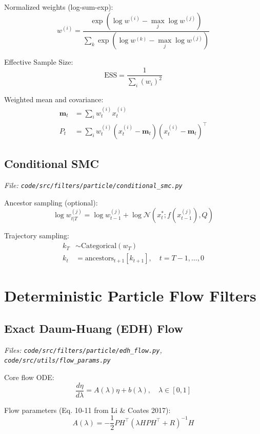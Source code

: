 \documentclass[12pt]{article}
\begin{document}
Normalized weights (log-sum-exp):
\begin{equation}
w^{(i)} = \frac{\exp(\log w^{(i)} - \max_j \log w^{(j)})}{\sum_k \exp(\log w^{(k)} - \max_j \log w^{(j)})}
\end{equation}

Effective Sample Size:
\begin{equation}
\text{ESS} = \frac{1}{\sum_i (w_i)^2}
\end{equation}

Weighted mean and covariance:
\begin{align}
\boldsymbol{m}_t &= \sum_i w_t^{(i)} x_t^{(i)} \\
P_t &= \sum_i w_t^{(i)} (x_t^{(i)} - \boldsymbol{m}_t)(x_t^{(i)} - \boldsymbol{m}_t)^\top
\end{align}

\subsection{Conditional SMC}
\textit{File: \texttt{code/src/filters/particle/conditional\_smc.py}}

Ancestor sampling (optional):
\begin{equation}
\log w_{t|T}^{(j)} = \log w_{t-1}^{(j)} + \log \mathcal{N}(x^*_t; f(x_{t-1}^{(j)}), Q)
\end{equation}

Trajectory sampling:
\begin{align}
k_T &\sim \text{Categorical}(w_T) \\
k_t &= \text{ancestors}_{t+1}[k_{t+1}], \quad t = T-1, \ldots, 0
\end{align}

\section{Deterministic Particle Flow Filters}

\subsection{Exact Daum-Huang (EDH) Flow}
\textit{Files: \texttt{code/src/filters/particle/edh\_flow.py}, \texttt{code/src/utils/flow\_params.py}}

Core flow ODE:
\begin{equation}
\frac{d\eta}{d\lambda} = A(\lambda) \eta + b(\lambda), \quad \lambda \in [0, 1]
\end{equation}

Flow parameters (Eq. 10-11 from Li \& Coates 2017):
\begin{equation}
A(\lambda) = -\frac{1}{2} P H^\top (\lambda H P H^\top + R)^{-1} H
\end{equation}
\end{document}
